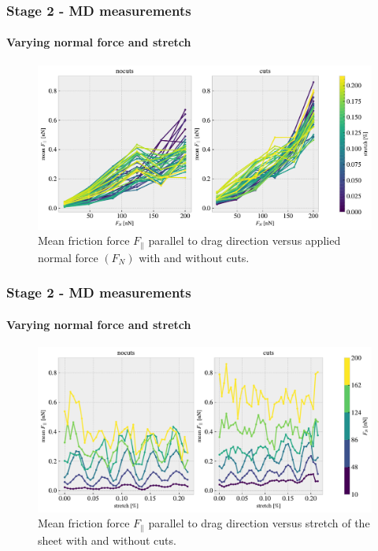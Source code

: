 \documentclass[
	10pt, %
]{beamer}
\begin{document}

	


\begin{frame}
	\frametitle{Stage 2 - MD measurements}
	\framesubtitle{Varying normal force and stretch}
	\begin{figure}
		\includegraphics[width=\linewidth]{figures/multi0.pdf}
		\caption{Mean friction force $F_{\parallel}$ parallel to drag direction versus applied normal force $(F_N)$ with and without cuts.}
	\end{figure}	
\end{frame}

\begin{frame}
	\frametitle{Stage 2 - MD measurements}
	\framesubtitle{Varying normal force and stretch}
	\begin{figure}
		\includegraphics[width=\linewidth]{figures/multi2.pdf}
		\caption{Mean friction force $F_{\parallel}$ parallel to drag direction versus stretch of the sheet with and without cuts.}
	\end{figure}	
\end{frame}
\end{document}
